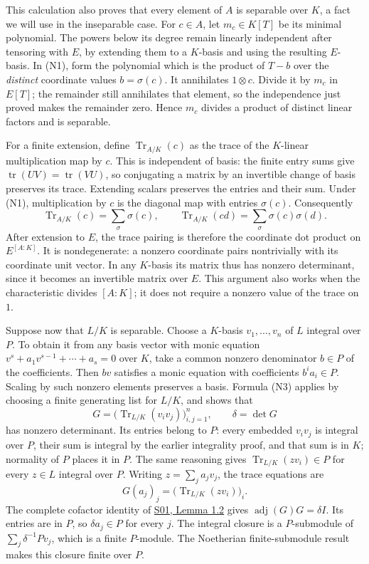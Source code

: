 \documentclass[11pt,a4paper,openany]{report}
\begin{document}
This calculation also proves that every element of \(A\) is separable over \(K\), a fact we will use in the inseparable case. For \(c\in A\), let \(m_c\in K[T]\) be its minimal polynomial. The powers below its degree remain linearly independent after tensoring with \(E\), by extending them to a \(K\)-basis and using the resulting \(E\)-basis. In (N1), form the polynomial which is the product of \(T-b\) over the \emph{distinct} coordinate values \(b=\sigma(c)\). It annihilates \(1\otimes c\). Divide it by \(m_c\) in \(E[T]\); the remainder still annihilates that element, so the independence just proved makes the remainder zero. Hence \(m_c\) divides a product of distinct linear factors and is separable.

For a finite extension, define \(\operatorname{Tr}_{A/K}(c)\) as the trace of the \(K\)-linear multiplication map by \(c\). This is independent of basis: the finite entry sums give \(\operatorname{tr}(UV)=\operatorname{tr}(VU)\), so conjugating a matrix by an invertible change of basis preserves its trace. Extending scalars preserves the entries and their sum. Under (N1), multiplication by \(c\) is the diagonal map with entries \(\sigma(c)\). Consequently \[
\operatorname{Tr}_{A/K}(c)=\sum_\sigma\sigma(c),
\qquad
\operatorname{Tr}_{A/K}(cd)=\sum_\sigma\sigma(c)\sigma(d). \tag{N3}
\] After extension to \(E\), the trace pairing is therefore the coordinate dot product on \(E^{[A:K]}\). It is nondegenerate: a nonzero coordinate pairs nontrivially with its coordinate unit vector. In any \(K\)-basis its matrix thus has nonzero determinant, since it becomes an invertible matrix over \(E\). This argument also works when the characteristic divides \([A:K]\); it does not require a nonzero value of the trace on \(1\).

Suppose now that \(L/K\) is separable. Choose a \(K\)-basis \(v_1,\ldots,v_n\) of \(L\) integral over \(P\). To obtain it from any basis vector with monic equation \(v^s+a_1v^{s-1}+\cdots+a_s=0\) over \(K\), take a common nonzero denominator \(b\in P\) of the coefficients. Then \(bv\) satisfies a monic equation with coefficients \(b^ia_i\in P\). Scaling by such nonzero elements preserves a basis. Formula (N3) applies by choosing a finite generating list for \(L/K\), and shows that \[
G=\bigl(\operatorname{Tr}_{L/K}(v_iv_j)\bigr)_{i,j=1}^n,
\qquad \delta=\det G
\] has nonzero determinant. Its entries belong to \(P\): every embedded \(v_iv_j\) is integral over \(P\), their sum is integral by the earlier integrality proof, and that sum is in \(K\); normality of \(P\) places it in \(P\). The same reasoning gives \(\operatorname{Tr}_{L/K}(zv_i)\in P\) for every \(z\in L\) integral over \(P\). Writing \(z=\sum_j a_jv_j\), the trace equations are \[
G(a_j)_j=\bigl(\operatorname{Tr}_{L/K}(zv_i)\bigr)_i.
\] The complete cofactor identity of \href{https://github.com/KokunoYumeto/open-math-courses/blob/main/docs/courses/AG-RG/AG-RG-S01.md}{S01, Lemma 1.2} gives \(\operatorname{adj}(G)G=\delta I\). Its entries are in \(P\), so \(\delta a_j\in P\) for every \(j\). The integral closure is a \(P\)-submodule of \(\sum_j\delta^{-1}Pv_j\), which is a finite \(P\)-module. The Noetherian finite-submodule result makes this closure finite over \(P\).
\end{document}
